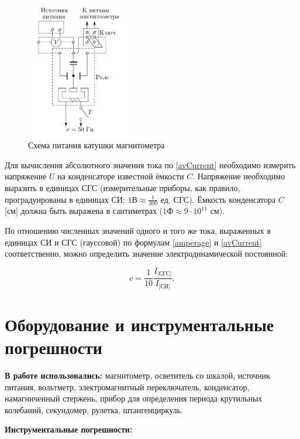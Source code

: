 \documentclass[a4paper,12pt]{article} %
\begin{document}
\begin{figure}[h!]
\begin{center}
    \includegraphics[width=0.4\textwidth]{circuit.png}
\end{center}
\caption{Схема питания катушки магнитометра}
\label{fig:circuit}
\end{figure}

Для вычисления абсолютного значения тока по \eqref{avCurrent} необходимо измерить напряжение $U$ на конденсаторе известной ёмкости $C$. Напряжение необходимо выразить в единицах СГС (измерительные приборы, как правило, проградуированы в единицах СИ: $1 \text{В} \approx \frac{1}{300}$ ед. СГС). Ёмкость конденсатора $C$ [см] должна быть выражена в сантиметрах ($1 \text{Ф} \approx 9 \cdot 10^{11}$ см).

По отношению численных значений одного и того же тока, выраженных в единицах СИ и СГС (гауссовой) по формулам \eqref{amperage} и \eqref{avCurrent} соответственно, можно определить значение электродинамической постоянной:

\begin{equation}
    c = \frac{1}{10}\frac{I_\text{[СГС]}}{I_\text{[СИ]}}.
\label{electroConst}
\end{equation}

\section{Оборудование и инструментальные погрешности}

\textbf{В работе использовались:} магнитометр, осветитель со шкалой, источник питания, вольтметр, электромагнитный переключатель, конденсатор, намагниченный стержень, прибор для определения периода крутильных колебаний, секундомер, рулетка, штангенциркуль.

\textbf{Инструментальные погрешности:}
\end{document}
